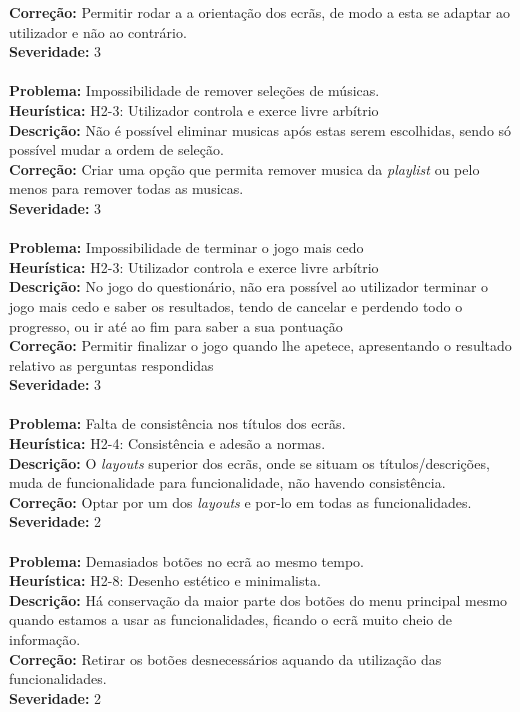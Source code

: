 \documentclass{article}
\begin{document}
\textbf{Correção:} Permitir rodar a a orientação dos ecrãs, de modo a esta se adaptar ao utilizador e não ao contrário.\\
\textbf{Severidade:} 3\\
\\
\textbf{Problema:} Impossibilidade de remover seleções de músicas.\\
\textbf{Heurística:} H2-3: Utilizador controla e exerce livre arbítrio\\
\textbf{Descrição:} Não é possível eliminar musicas após estas serem escolhidas, sendo só possível mudar a ordem de seleção.\\
\textbf{Correção:} Criar uma opção que permita remover musica da \textit{playlist} ou pelo menos para remover todas as musicas.\\
\textbf{Severidade:} 3\\
\\
\textbf{Problema:} Impossibilidade de terminar o jogo mais cedo\\
\textbf{Heurística:} H2-3: Utilizador controla e exerce livre arbítrio\\
\textbf{Descrição:} No jogo do questionário, não era possível ao utilizador terminar o jogo mais cedo e saber os resultados, tendo de cancelar e perdendo todo o progresso, ou ir até ao fim para saber a sua pontuação\\
\textbf{Correção:} Permitir finalizar o jogo quando lhe apetece, apresentando o resultado relativo as perguntas respondidas\\
\textbf{Severidade:} 3\\
\\
\textbf{Problema:} Falta de consistência nos títulos dos ecrãs.\\
\textbf{Heurística:} H2-4: Consistência e adesão a normas.\\
\textbf{Descrição:} O \textit{layouts} superior dos ecrãs, onde se situam os títulos/descrições, muda de funcionalidade para funcionalidade, não havendo consistência.\\
\textbf{Correção:} Optar por um dos \textit{layouts} e por-lo em todas as funcionalidades.\\
\textbf{Severidade:} 2\\
\\
\textbf{Problema:} Demasiados botões no ecrã ao mesmo tempo.\\
\textbf{Heurística:} H2-8: Desenho estético e minimalista.\\
\textbf{Descrição:} Há conservação da maior parte dos botões do menu principal mesmo quando estamos a usar as funcionalidades, ficando o ecrã muito cheio de informação.\\
\textbf{Correção:} Retirar os botões desnecessários aquando da utilização das funcionalidades.\\
\textbf{Severidade:} 2\\
\\
\end{document}
